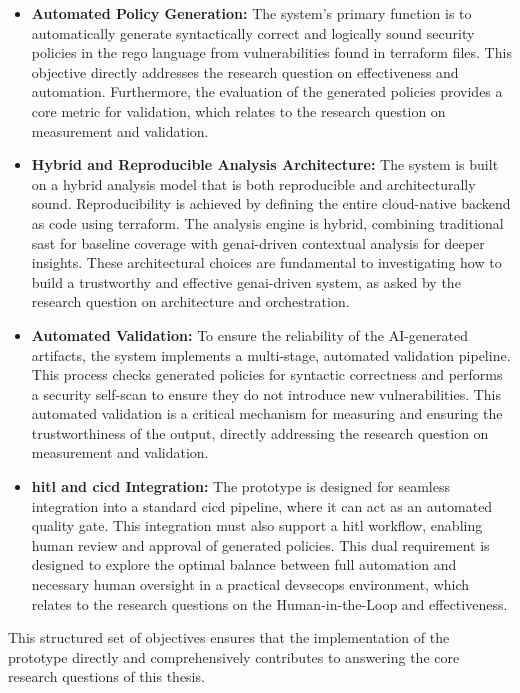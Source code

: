\begin{itemize}
\item \textbf{Automated Policy Generation:} The system's primary function is to automatically generate syntactically correct and logically sound security policies in the \gls{rego} language from vulnerabilities found in \gls{terraform} files. This objective directly addresses the research question on effectiveness and automation. Furthermore, the evaluation of the generated policies provides a core metric for validation, which relates to the research question on measurement and validation.
\item \textbf{Hybrid and Reproducible Analysis Architecture:} The system is built on a hybrid analysis model that is both reproducible and architecturally sound. Reproducibility is achieved by defining the entire \gls{cloud-native} backend as code using \gls{terraform}. The analysis engine is hybrid, combining traditional \gls{sast} for baseline coverage with \gls{genai}-driven contextual analysis for deeper insights. These architectural choices are fundamental to investigating how to build a trustworthy and effective \gls{genai}-driven system, as asked by the research question on architecture and orchestration.
\item \textbf{Automated Validation:} To ensure the reliability of the AI-generated artifacts, the system implements a multi-stage, automated validation pipeline. This process checks generated policies for syntactic correctness and performs a security self-scan to ensure they do not introduce new vulnerabilities. This automated validation is a critical mechanism for measuring and ensuring the trustworthiness of the output, directly addressing the research question on measurement and validation.
\item \textbf{\gls{hitl} and \gls{cicd} Integration:} The prototype is designed for seamless integration into a standard \gls{cicd} pipeline, where it can act as an automated quality gate. This integration must also support a \gls{hitl} workflow, enabling human review and approval of generated policies. This dual requirement is designed to explore the optimal balance between full automation and necessary human oversight in a practical \gls{devsecops} environment, which relates to the research questions on the Human-in-the-Loop and effectiveness.
\end{itemize}

This structured set of objectives ensures that the implementation of the prototype directly and comprehensively contributes to answering the core research questions of this thesis.


